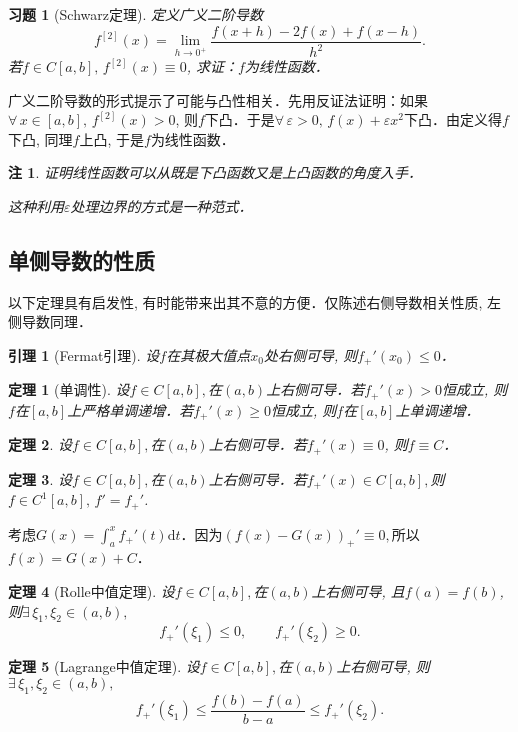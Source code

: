 \documentclass[11pt,a4paper]{ctexart}
\makeatletter
\theoremstyle{thmseries} %
\newtheorem{thm}{定理}[section]
\newtheorem{lem}{引理}[section]
\theoremstyle{exerseries}
\newtheorem{exer}{习题}[section]
\newtheorem*{rem}{注}
\renewenvironment{proof}[1][\proofname]{\par
  \pushQED{\qed}%
  \normalfont \topsep6\p@\@plus6\p@\relax
  \trivlist
  \item[\hskip\labelsep
        \itshape
    #1\@addpunct{}]\ignorespaces
}{%
  \popQED\endtrivlist\@endpefalse
}
\newenvironment{pf}{\begin{proof}[\bfseries\upshape 证\quad]}{\end{proof}}
\newcommand{\bra}[1]{\mathopen{}\left(#1\right)}
\renewcommand{\epsilon}{\varepsilon}
\renewcommand{\d}{\mathrm{d}}
\makeatother
\begin{document}
\begin{exer}[Schwarz定理]
	定义广义二阶导数
	\[f^{[2]}(x)=\lim_{h\to0^+}\frac{f(x+h)-2f(x)+f(x-h)}{h^2}.\]
	若$f\in C[a,b],\,f^{[2]}(x)\equiv0$, 求证：$f$为线性函数．
\end{exer}
\begin{pf}
	广义二阶导数的形式提示了可能与凸性相关．先用反证法证明：如果$\forall\,x\in[a,b],\,f^{[2]}(x)>0$, 则$f$下凸．于是$\forall\,\epsilon>0,\,f(x)+\epsilon x^2$下凸．由定义得$f$下凸, 同理$f$上凸, 于是$f$为线性函数．
\end{pf}
\begin{rem}
	证明线性函数可以从既是下凸函数又是上凸函数的角度入手．
	
	这种利用$\epsilon$处理边界的方式是一种范式．
\end{rem}


\subsection{单侧导数的性质}
以下定理具有启发性, 有时能带来出其不意的方便．仅陈述右侧导数相关性质, 左侧导数同理．
\begin{lem}[Fermat引理]
	设$f$在其极大值点$x_0$处右侧可导, 则$f_+'(x_0)\leq0$．
\end{lem}

\begin{thm}[单调性]
	设$f\in C[a,b],$在$(a,b)$上右侧可导．若$f_+'(x)>0$恒成立, 则$f$在$[a,b]$上严格单调递增．若$f_+'(x)\geq0$恒成立, 则$f$在$[a,b]$上单调递增．
\end{thm}

\begin{thm}
	设$f\in C[a,b],$在$(a,b)$上右侧可导．若$f_+'(x)\equiv0$, 则$f\equiv C$．
\end{thm}

\begin{thm}
	设$f\in C[a,b],$在$(a,b)$上右侧可导．若$f_+'(x)\in C[a,b],$则$f\in C^1[a,b],\,f'=f_+'$.
\end{thm}
\begin{pf}
	考虑$G(x)=\int_{a}^{x}f_+'(t)\d t$．因为$\bra{f(x)-G(x)}_+'\equiv0,$所以$f(x)=G(x)+C$．
\end{pf}

\begin{thm}[Rolle中值定理]
	设$f\in C[a,b],$在$(a,b)$上右侧可导, 且$f(a)=f(b)$, 则$\exists\,\xi_1,\xi_2\in(a,b),$
	\[f_+'(\xi_1)\leq0,\qquad f_+'(\xi_2)\geq0.\]
\end{thm}

\begin{thm}[Lagrange中值定理]
	设$f\in C[a,b],$在$(a,b)$上右侧可导, 则$\exists\,\xi_1,\xi_2\in(a,b),$
	\[f_+'(\xi_1)\leq\frac{f(b)-f(a)}{b-a}\leq f_+'(\xi_2).\]
\end{thm}
\end{document}
